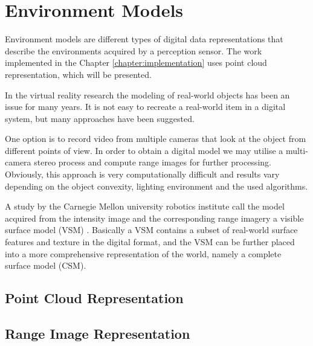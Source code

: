 \documentclass[12pt,a4paper,oneside,pdftex]{report}
\begin{document}
    


\section{Environment Models}
\label{section:3d_environment_representations}

Environment models are different types of digital data representations that describe the environments acquired by a perception sensor. The work implemented in the Chapter \ref{chapter:implementation} uses point cloud representation, which will be presented.



In the virtual reality research the modeling of real-world objects has been an issue for many years. It is not easy to recreate a real-world item in a digital system, but many approaches have been suggested.

One option is to record video from multiple cameras that look at the object from different points of view. In order to obtain a digital model we may utilise a multi-camera stereo process and compute range images for further processing. Obviously, this approach is very computationally difficult and results vary depending on the object convexity, lighting environment and the used algorithms.  

A study by the Carnegie Mellon university robotics institute call the model acquired from the intensity image and the corresponding range imagery a visible surface model (VSM) \cite{Rander97}. Basically a VSM contains a subset of real-world surface features and texture in the digital format, and the VSM can be further placed into a more comprehensive representation of the world, namely a complete surface model (CSM). 

\subsection{Point Cloud Representation}
\label{subsection:point_cloud_representation}


\subsection{Range Image Representation}
\label{subsection:range_image_representation}
\end{document}
